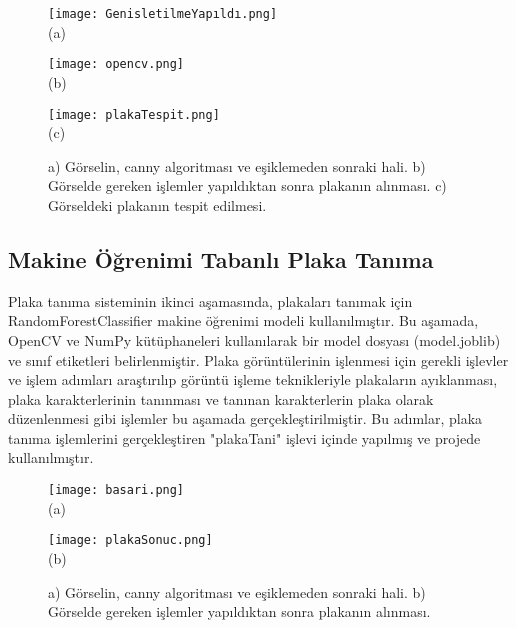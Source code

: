\documentclass[]{article}
\begin{document}
	\begin{figure}[htbp]
		\centering
		\begin{minipage}{0.45\textwidth}
			\centering
			\texttt{[image: GenisletilmeYapıldı.png]}
			\\
			(a)
		\end{minipage}
		\hfill
		\begin{minipage}{0.45\textwidth}
			\centering
			\texttt{[image: opencv.png]}
			\\
			(b)
		\end{minipage}
		\newline
	\end{figure}
	\begin{figure}[!ht]
		\centering
		\texttt{[image: plakaTespit.png]}\\(c)
		\caption{
			{a) Görselin, canny algoritması ve eşiklemeden sonraki hali.}
			{b) Görselde gereken işlemler yapıldıktan sonra plakanın alınması.}
			{c) Görseldeki plakanın tespit edilmesi.}}
	\end{figure}
	\newpage
	\subsection{Makine Öğrenimi Tabanlı Plaka Tanıma}
	 Plaka tanıma sisteminin ikinci aşamasında, plakaları tanımak için RandomForestClassifier makine öğrenimi modeli kullanılmıştır. Bu aşamada, OpenCV ve NumPy kütüphaneleri kullanılarak bir model dosyası (model.joblib) ve sınıf etiketleri belirlenmiştir. Plaka görüntülerinin işlenmesi için gerekli işlevler ve işlem adımları araştırılıp görüntü işleme teknikleriyle plakaların ayıklanması, plaka karakterlerinin tanınması ve tanınan karakterlerin plaka olarak düzenlenmesi gibi işlemler bu aşamada gerçekleştirilmiştir. Bu adımlar, plaka tanıma işlemlerini gerçekleştiren "plakaTani" işlevi içinde yapılmış ve projede kullanılmıştır\cite{github}.
	\begin{figure}[htbp]
		\centering
		\begin{minipage}{0.45\textwidth}
			\centering
			\texttt{[image: basari.png]}
			\\
			(a)
		\end{minipage}
		\hfill
		\begin{minipage}{0.45\textwidth}
			\centering
			\texttt{[image: plakaSonuc.png]}
			\\
			(b)
		\end{minipage}
		\newline
		\caption{
			{a) Görselin, canny algoritması ve eşiklemeden sonraki hali.}
			{b) Görselde gereken işlemler yapıldıktan sonra plakanın alınması.}}
		
	\end{figure}
		\newpage
\end{document}
